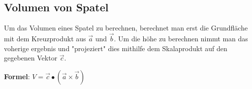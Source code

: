 \subsection{Volumen von Spatel}
Um das Volumen eines Spatel zu berechnen, berechnet man erst die Grundfläche mit dem Kreuzprodukt aus $\vec{a}$ und $\vec{b}$.
Um die höhe zu berechnen nimmt man das voherige ergebnis und "projeziert" dies mithilfe dem Skalaprodukt auf den gegebenen Vektor $\vec{c}$.

\textbf{Formel}: $V = \vec{c} \bullet (\vec{a} \times \vec{b})$
